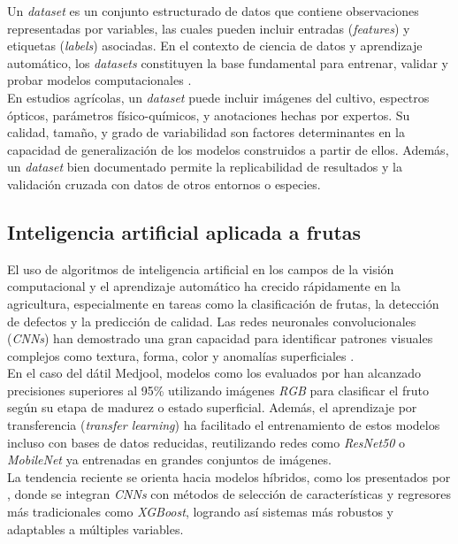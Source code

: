 Un \textit{dataset} es un conjunto estructurado de datos que contiene observaciones representadas por variables, las cuales pueden incluir entradas (\textit{features}) y etiquetas (\textit{labels}) asociadas. En el contexto de ciencia de datos y aprendizaje automático, los \textit{datasets} constituyen la base fundamental para entrenar, validar y probar modelos computacionales \parencite{kamilaris_deep_2018}.\\

En estudios agrícolas, un \textit{dataset} puede incluir imágenes del cultivo, espectros ópticos, parámetros físico-químicos, y anotaciones hechas por expertos. Su calidad, tamaño, y grado de variabilidad son factores determinantes en la capacidad de generalización de los modelos construidos a partir de ellos. Además, un \textit{dataset} bien documentado permite la replicabilidad de resultados y la validación cruzada con datos de otros entornos o especies.

\subsection{Inteligencia artificial aplicada a frutas}

El uso de algoritmos de inteligencia artificial en los campos de la visión computacional y el aprendizaje automático ha crecido rápidamente en la agricultura, especialmente en tareas como la clasificación de frutas, la detección de defectos y la predicción de calidad. Las redes neuronales convolucionales (\textit{CNNs}) han demostrado una gran capacidad para identificar patrones visuales complejos como textura, forma, color y anomalías superficiales \parencite{albarrak_deep_2022, alsirhani_novel_2023}.\\

En el caso del dátil Medjool, modelos como los evaluados por \parencite{almomen_date_2023} han alcanzado precisiones superiores al 95\% utilizando imágenes \textit{RGB} para clasificar el fruto según su etapa de madurez o estado superficial. Además, el aprendizaje por transferencia (\textit{transfer learning}) ha facilitado el entrenamiento de estos modelos incluso con bases de datos reducidas, reutilizando redes como \textit{ResNet50} o \textit{MobileNet} ya entrenadas en grandes conjuntos de imágenes.\\

La tendencia reciente se orienta hacia modelos híbridos, como los presentados por \parencite{said_smartripen_2025}, donde se integran \textit{CNNs} con métodos de selección de características y regresores más tradicionales como \textit{XGBoost}, logrando así sistemas más robustos y adaptables a múltiples variables.

